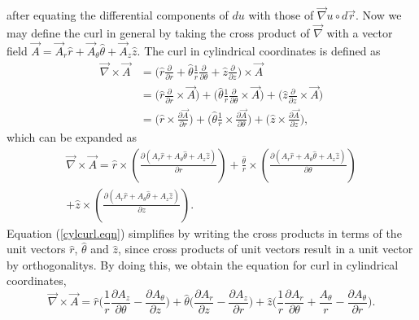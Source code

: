 \documentclass[12pt]{article}
\theoremstyle{definition}
\numberwithin{equation}{section}
\begin{document}
{\begin{equation}
\end{equation}
after equating the differential components of $du$ with those of $\vec{\nabla}u\circ d\vec{r}$.
Now we may define the curl in general by taking the cross product of $\vec{\nabla}$ with a vector field $\vec{A}=\vec{A}_{r}\hat{r}+\vec{A}_{\theta}\hat{\theta}+\vec{A}_{z}\hat{z}$. The curl in cylindrical coordinates is defined as 
\begin{align*}
\vec{\nabla}\times\vec{A} &= \bigg(\hat{r}\frac{\partial}{\partial r}+\hat{\theta}\frac{1}{r}\frac{\partial}{\partial\theta}+\hat{z}\frac{\partial}{\partial z}\bigg)\times\vec{A}
\\&= \bigg(\hat{r}\frac{\partial}{\partial r}\times\vec{A}\bigg)+\bigg(\hat{\theta}\frac{1}{r}\frac{\partial}{\partial\theta}\times\vec{A}\bigg)+\bigg(\hat{z}\frac{\partial}{\partial z}\times\vec{A}\bigg)
\\&= 
\bigg(\hat{r}\times\frac{\partial\vec{A}}{\partial r}\bigg)+\bigg(\hat{\theta}\frac{1}{r}\times\frac{\partial\vec{A}}{\partial\theta}\bigg)+\bigg(\hat{z}\times\frac{\partial\vec{A}}{\partial z}\bigg),
\end{align*}
which can be expanded as
\begin{multline}
\vec{\nabla}\times\vec{A}=\hat{r}\times\left(\frac{\partial (A_r\hat{r}+A_{\theta}\hat{\theta}+A_z\hat{z})}{\partial r}\right)
+\frac{\hat{\theta}}{r}\times\left(\frac{\partial (A_r\hat{r}+A_{\theta}\hat{\theta}+A_z\hat{z})}{\partial\theta}\right)
\\+\hat{z}\times\left(\frac{\partial (A_r\hat{r}+A_{\theta}\hat{\theta}+A_z\hat{z})}{\partial z}\right).
\end{multline}
Equation (\ref{cylcurl.eqn}) simplifies by writing the cross products in terms of the unit vectors $\hat{r}$, $\hat{\theta}$ and $\hat{z}$, since cross products of unit vectors result in a unit vector by orthogonalitys. By doing this, we obtain the equation for curl in cylindrical coordinates,
\begin{equation}
\vec{\nabla}\times\vec{A}=\hat{r}\bigg(\frac{1}{r}\frac{\partial A_z}{\partial\theta}-\frac{\partial A_{\theta}}{\partial z}\bigg)
+\hat{\theta}\bigg(\frac{\partial A_r}{\partial z}-\frac{\partial A_z}{\partial r}\bigg)+\hat{z}\bigg(\frac{1}{r}\frac{\partial A_r}{\partial\theta}
+\frac{A_{\theta}}{r}-\frac{\partial A_{\theta}}{\partial r}\bigg).\label{cylcurl.eqn}
\end{equation}

}
\end{document}
